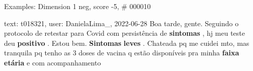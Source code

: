 \begin{frame}{Examples: Dimension 1 neg, score -5, \# 000010}
\footnotesize
\begin{alertblock}{text: t018321, user: DanielaLima\_, 2022-06-28}
Boa tarde, gente. Seguindo o protocolo de retestar para Covid com persistência 
de \textbf{sintomas} , hj meu teste deu \textbf{positivo} . Estou bem. 
\textbf{Sintomas} \textbf{leves} . Chateada pq me cuidei mto, mas tranquila pq 
tenho as 3 doses de vacina q estão disponíveis pra minha \textbf{faixa} 
\textbf{etária} e com acompanhamento 
\end{alertblock}
\end{frame}
